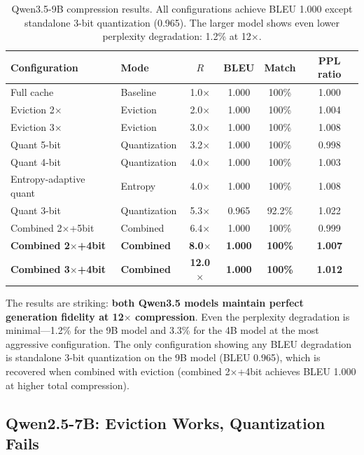 \documentclass[11pt]{article}
\begin{document}
\begin{table}[htbp]
\centering
\caption{Qwen3.5-9B compression results.  All configurations achieve BLEU 1.000 except standalone 3-bit quantization (0.965).  The larger model shows even lower perplexity degradation: 1.2\% at 12$\times$.}
\label{tab:qwen35_9b}
\begin{tabular}{@{}llcccc@{}}
\toprule
Configuration & Mode & $R$ & BLEU & Match & PPL ratio \\
\midrule
Full cache & Baseline & 1.0$\times$ & 1.000 & 100\% & 1.000 \\
Eviction 2$\times$ & Eviction & 2.0$\times$ & 1.000 & 100\% & 1.004 \\
Eviction 3$\times$ & Eviction & 3.0$\times$ & 1.000 & 100\% & 1.008 \\
Quant 5-bit & Quantization & 3.2$\times$ & 1.000 & 100\% & 0.998 \\
Quant 4-bit & Quantization & 4.0$\times$ & 1.000 & 100\% & 1.003 \\
Entropy-adaptive quant & Entropy & 4.0$\times$ & 1.000 & 100\% & 1.008 \\
Quant 3-bit & Quantization & 5.3$\times$ & 0.965 & 92.2\% & 1.022 \\
Combined 2$\times$+5bit & Combined & 6.4$\times$ & 1.000 & 100\% & 0.999 \\
\textbf{Combined 2$\times$+4bit} & \textbf{Combined} & \textbf{8.0$\times$} & \textbf{1.000} & \textbf{100\%} & \textbf{1.007} \\
\textbf{Combined 3$\times$+4bit} & \textbf{Combined} & \textbf{12.0$\times$} & \textbf{1.000} & \textbf{100\%} & \textbf{1.012} \\
\bottomrule
\end{tabular}
\end{table}

The results are striking: \textbf{both Qwen3.5 models maintain perfect generation fidelity at 12$\times$ compression}.  Even the perplexity degradation is minimal---1.2\% for the 9B model and 3.3\% for the 4B model at the most aggressive configuration.  The only configuration showing any BLEU degradation is standalone 3-bit quantization on the 9B model (BLEU 0.965), which is recovered when combined with eviction (combined 2$\times$+4bit achieves BLEU 1.000 at higher total compression).

\subsection{Qwen2.5-7B: Eviction Works, Quantization Fails}
\label{sec:qwen25_results}
\end{document}
